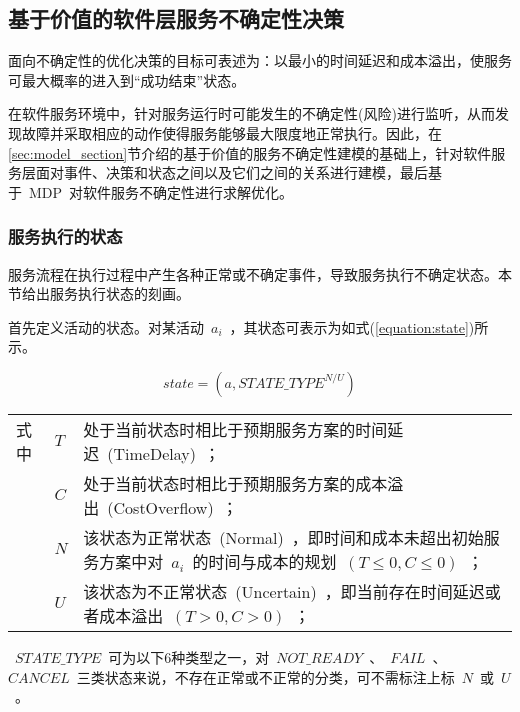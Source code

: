 \subsection{基于价值的软件层服务不确定性决策}

面向不确定性的优化决策的目标可表述为：以最小的时间延迟和成本溢出，使服务可最大概率的进入到“成功结束”状态。

在软件服务环境中，针对服务运行时可能发生的不确定性(风险)进行监听，从而发现故障并采取相应的动作使得服务能够最大限度地正常执行。因此，在\ref{sec:model_section}节介绍的基于价值的服务不确定性建模的基础上，针对软件服务层面对事件、决策和状态之间以及它们之间的关系进行建模，最后基于~MDP~对软件服务不确定性进行求解优化。

\subsubsection{服务执行的状态} 

服务流程在执行过程中产生各种正常或不确定事件，导致服务执行不确定状态。本节给出服务执行状态的刻画。

首先定义活动的状态。对某活动~$a_i$~，其状态可表示为如式(\ref{equation:state})所示。

\begin{equation}\label{equation:state}
state=(a, STATE\_TYPE^{N/U})
\end{equation}
\begin{tabularx}{\textwidth}{@{}l@{\quad}l@{\pozhehao }X@{}}
    式中
    & $T$ & 处于当前状态时相比于预期服务方案的时间延迟~(TimeDelay)~；\\
    & $C$ & 处于当前状态时相比于预期服务方案的成本溢出~(CostOverflow)~；\\
    & $N$ & 该状态为正常状态~(Normal)~，即时间和成本未超出初始服务方案中对~$a_i$~的时间与成本的规划~$(T\le 0, C\le 0)$~；\\
    & $U$ & 该状态为不正常状态~(Uncertain)~，即当前存在时间延迟或者成本溢出~$(T>0, C>0)$~；
\end{tabularx}\vspace{\wordsep}

~$STATE\_TYPE$~可为以下6种类型之一，对~$NOT\_READY$~、~$FAIL$~、~$CANCEL$~三类状态来说，不存在正常或不正常的分类，可不需标注上标~$N$~或~$U$~。

